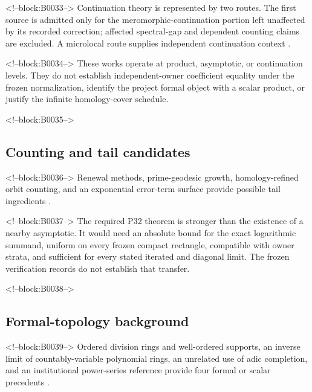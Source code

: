 \documentclass[11pt]{article}
\begin{document}
<!--block:B0033-->
Continuation theory is represented by two routes. The first source is
admitted only for the meromorphic-continuation portion left unaffected
by its recorded correction; affected spectral-gap and dependent counting
claims are excluded. A microlocal route supplies independent
continuation context
\citep{P32-S17,P32-S18}.

<!--block:B0034-->
These works operate at product, asymptotic, or continuation levels. They
do not establish independent-owner coefficient equality under the frozen
normalization, identify the project formal object with a scalar product,
or justify the infinite homology-cover schedule.

<!--block:B0035-->
\hypertarget{24-counting-and-tail-candidates}{%
\subsection{Counting and tail
candidates}\label{24-counting-and-tail-candidates}}

<!--block:B0036-->
Renewal methods, prime-geodesic growth, homology-refined orbit counting,
and an exponential error-term surface provide possible tail ingredients
\citep{P32-S19,P32-S20,P32-S21,P32-S22}.

<!--block:B0037-->
The required P32 theorem is stronger than the existence of a nearby
asymptotic. It would need an absolute bound for the exact logarithmic
summand, uniform on every frozen compact rectangle, compatible with
owner strata, and sufficient for every stated iterated and diagonal
limit. The frozen verification records do not establish that transfer.

<!--block:B0038-->
\hypertarget{25-formal-topology-background}{%
\subsection{Formal-topology
background}\label{25-formal-topology-background}}

<!--block:B0039-->
Ordered division rings and well-ordered supports, an inverse limit of
countably-variable polynomial rings, an unrelated use of adic
completion, and an institutional power-series reference provide four
formal or scalar precedents
\citep{P32-S23,P32-S24,P32-S25,P32-S26}.
\end{document}
